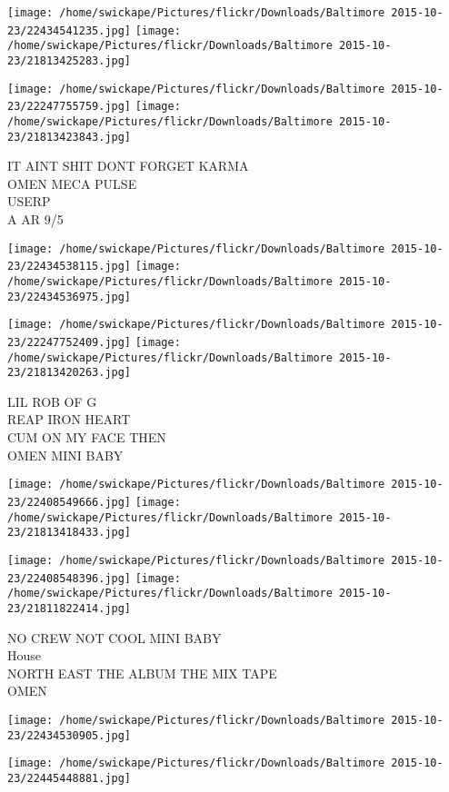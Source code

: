 \documentclass[10pt,letterpaper]{article}
\begin{document}
\texttt{[image: /home/swickape/Pictures/flickr/Downloads/Baltimore 2015-10-23/22434541235.jpg]}
\texttt{[image: /home/swickape/Pictures/flickr/Downloads/Baltimore 2015-10-23/21813425283.jpg]}

\texttt{[image: /home/swickape/Pictures/flickr/Downloads/Baltimore 2015-10-23/22247755759.jpg]}
\texttt{[image: /home/swickape/Pictures/flickr/Downloads/Baltimore 2015-10-23/21813423843.jpg]}

IT AINT SHIT DONT FORGET KARMA\\
OMEN MECA PULSE\\
USERP\\
A AR 9/5
\pagebreak

\texttt{[image: /home/swickape/Pictures/flickr/Downloads/Baltimore 2015-10-23/22434538115.jpg]}
\texttt{[image: /home/swickape/Pictures/flickr/Downloads/Baltimore 2015-10-23/22434536975.jpg]}

\texttt{[image: /home/swickape/Pictures/flickr/Downloads/Baltimore 2015-10-23/22247752409.jpg]}
\texttt{[image: /home/swickape/Pictures/flickr/Downloads/Baltimore 2015-10-23/21813420263.jpg]}

LIL ROB OF G\\
REAP IRON HEART\\
CUM ON MY FACE THEN\\
OMEN MINI BABY
\pagebreak

\texttt{[image: /home/swickape/Pictures/flickr/Downloads/Baltimore 2015-10-23/22408549666.jpg]}
\texttt{[image: /home/swickape/Pictures/flickr/Downloads/Baltimore 2015-10-23/21813418433.jpg]}

\texttt{[image: /home/swickape/Pictures/flickr/Downloads/Baltimore 2015-10-23/22408548396.jpg]}
\texttt{[image: /home/swickape/Pictures/flickr/Downloads/Baltimore 2015-10-23/21811822414.jpg]}

NO CREW NOT COOL MINI BABY\\
House\\
NORTH EAST THE ALBUM THE MIX TAPE\\
OMEN
\pagebreak

\texttt{[image: /home/swickape/Pictures/flickr/Downloads/Baltimore 2015-10-23/22434530905.jpg]}

\vspace{0.25in}
\texttt{[image: /home/swickape/Pictures/flickr/Downloads/Baltimore 2015-10-23/22445448881.jpg]}
\end{document}
